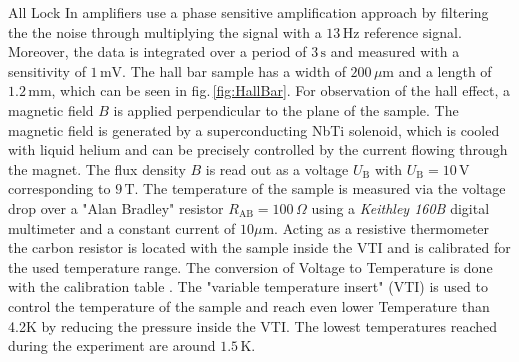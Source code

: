All Lock In amplifiers use a phase sensitive amplification approach by filtering the the noise through multiplying the signal
with a $13\,\text{Hz}$ reference signal. Moreover, the data is integrated over a period of $3\,\text{s}$ and measured with a sensitivity of $1\,\text{mV}$.
The hall bar sample has a width of $200\,\mu\text{m}$ and a length of $1.2\,\text{mm}$, which can be seen in fig.\,\ref{fig:HallBar}.
For observation of the hall effect, a magnetic field $B$ is applied perpendicular to the plane of the sample.
The magnetic field is generated by a superconducting NbTi solenoid, which is cooled with liquid helium and can
be precisely controlled by the current flowing through the magnet. The flux density $B$ is read out as a voltage
$U_\text{B}$ with $U_\text{B}=10\,\text{V}$ corresponding to $9\,\text{T}$. The temperature of the sample is measured
via the voltage drop over a "Alan Bradley" resistor $R_\text{AB}=100\,\Omega$ using a \emph{Keithley 160B} digital multimeter and a constant current of $10\mu\text{m}$.
Acting as a resistive thermometer the carbon resistor is located with the sample inside the VTI and is calibrated for the used temperature range.
The conversion of Voltage to Temperature is done with the calibration table \cite{ExperimentDescription}.
The "variable temperature insert" (VTI) is used to control the temperature of the sample and reach even lower Temperature than 4.2K
by reducing the pressure inside the VTI. The lowest temperatures reached during the experiment are around $1.5\,\text{K}$.

